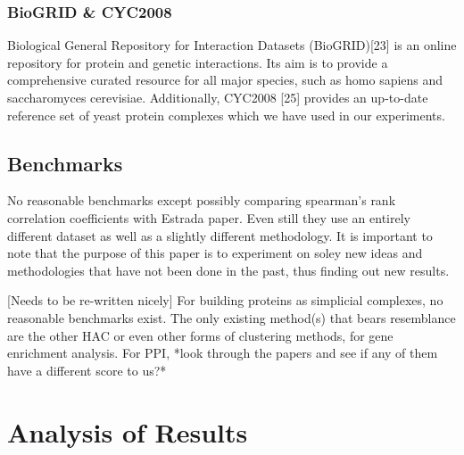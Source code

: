 \documentclass[9pt]{article}
\begin{document}
\subsubsection{BioGRID \& CYC2008}
Biological General Repository for Interaction Datasets (BioGRID)[23] is an online repository for protein and genetic interactions. Its aim is to provide a comprehensive curated resource for all major species, such as homo sapiens and saccharomyces cerevisiae. Additionally, CYC2008 [25] provides an up-to-date reference set of yeast protein complexes which we have used in our experiments. 

\subsection{Benchmarks}
No reasonable benchmarks except possibly comparing spearman’s rank correlation coefficients with Estrada paper. Even still they use an entirely different dataset as well as a slightly different methodology. It is important to note that the purpose of this paper is to experiment on soley new ideas and methodologies that have not been done in the past, thus finding out new results.  

[Needs to be re-written nicely]
For building proteins as simplicial complexes, no reasonable benchmarks exist. The only existing method(s) that bears resemblance are the other HAC or even other forms of clustering methods, for gene enrichment analysis. 
For PPI, *look through the papers and see if any of them have a different score to us?*

\newpage
\section{Analysis of Results}
\end{document}
